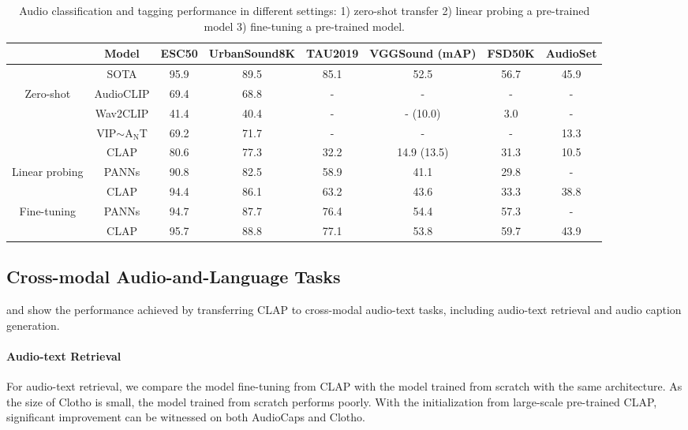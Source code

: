 \documentclass[sigconf,anonymous,review]{acmart}
\begin{document}
\begin{table}[ht]
    \centering
    \begin{tabular}{cc||cccccc}
    \toprule
     & Model & ESC50 & UrbanSound8K & TAU2019 & VGGSound (mAP) & FSD50K & AudioSet\\
    \midrule
     & SOTA & 95.9 & 89.5 & 85.1 & 52.5 & 56.7 & 45.9\\
    \midrule
    \multirow{4}{*}{Zero-shot} & AudioCLIP & 69.4 & 68.8 & - & - & - & -\\
     & Wav2CLIP & 41.4 & 40.4 & - & - (10.0) & 3.0 & - \\
     & VIP$\sim$A$_\text{N}$T & 69.2 & 71.7 & - & - & - & 13.3\\
     & CLAP & 80.6 & 77.3 & 32.2 & 14.9 (13.5) & 31.3 & 10.5\\
    \midrule
    \multirow{2}{*}{Linear probing} & PANNs & 90.8 & 82.5 & 58.9 & 41.1 & 29.8 & - \\
     & CLAP & 94.4 & 86.1 & 63.2 & 43.6 & 33.3 & 38.8\\
    \midrule
    \multirow{2}{*}{Fine-tuning} & PANNs & 94.7 & 87.7 & 76.4 & 54.4 & 57.3 & - \\
     & CLAP & 95.7 & 88.8 & 77.1 & 53.8 & 59.7 & 43.9\\
    \bottomrule
    \end{tabular}
    \caption{Audio classification and tagging performance in different settings: 1) zero-shot transfer 2) linear probing a pre-trained model 3) fine-tuning a pre-trained model.}
    \label{tab:classify_performance}
\end{table}

\subsection{Cross-modal Audio-and-Language Tasks}

 and  show the performance achieved by transferring CLAP to cross-modal audio-text tasks, including audio-text retrieval and audio caption generation.
\paragraph*{Audio-text Retrieval} For audio-text retrieval, we compare the model fine-tuning from CLAP with the model trained from scratch with the same architecture.
As the size of Clotho is small, the model trained from scratch performs poorly.
With the initialization from large-scale pre-trained CLAP, significant improvement can be witnessed on both AudioCaps and Clotho.
\end{document}
